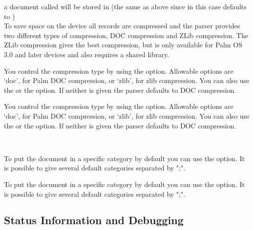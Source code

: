 a document called  will be stored in
 (the same as above since 
in this case defaults to )\\

To save space on the device all records are compressed and the
parser provides two different types of compression, DOC compression
and ZLib compression. The ZLib compression gives the best compression,
but is only available for Palm OS 3.0 and later devices and also
requires a shared library.\\

\begin{latexonly}
You control the compression type by using the
 option. 
Allowable options are `doc', for Palm DOC compression, 
or `zlib', for zlib compression. You can also use the
 or the
 option. If
neither is given the parser defaults to DOC compression.
\end{latexonly}
\begin{htmlonly}
You control the compression type by using the
 option. 
Allowable options are `doc', for Palm DOC compression, 
or `zlib', for zlib compression. You can also use the
 or the
 option. If
neither is given the parser defaults to DOC compression.
\end{htmlonly}\\

\begin{latexonly}
To put the document in a specific category by default you can use
the  option. It is possible
to give several default categories separated by ";".
\end{latexonly}
\begin{htmlonly}
To put the document in a specific category by default you can use
the  option. It is possible 
to give several default categories separated by ";".
\end{htmlonly}

\subsection{Status Information and Debugging}

